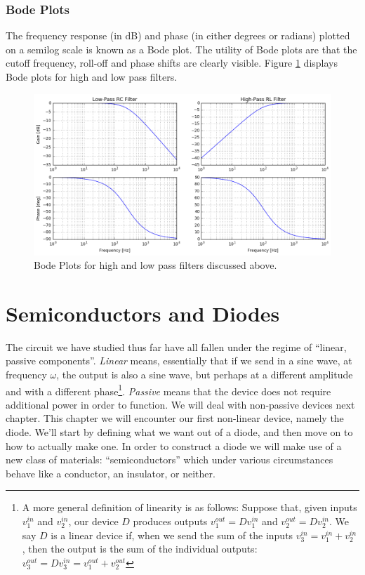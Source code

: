\documentclass{tufte-book}
\begin{document}
\subsection{Bode Plots}
The frequency response (in dB) and phase (in either degrees or radians) plotted on a semilog scale is known as a Bode plot. The utility of Bode plots are that the cutoff frequency, roll-off and phase shifts are clearly visible. Figure \ref{fig:bode_filts} displays Bode plots for high and low pass filters.


\begin{figure}[h]
\caption{Bode Plots for high and low pass filters discussed above.}
\label{fig:bode_filts}
\begin{center}
\includegraphics[width=\textwidth]{bode_filts.png}
\end{center}
\end{figure}

\chapter{Semiconductors and Diodes}
The circuit we have studied thus far have all fallen under the regime of ``linear, passive components''. \textit{Linear} means, essentially that if we send in a sine wave, at frequency $\omega$, the output is also a sine wave, but perhaps at a different amplitude and with a different phase\footnote{A more general definition of linearity is as follows: Suppose that, given inputs $v_1^{in}$ and $v_2^{in}$, our device $D$ produces outputs $v_1^{out} = Dv_1^{in}$ and $v_2^{out} = Dv_2^{in}$. We say $D$ is a linear device if, when we send the sum of the inputs $v_3^{in} = v_1^{in} + v_2^{in}$, then the output is the sum of the individual outputs: $v_3^{out} = Dv_3^{in} =  v_1^{out} + v_2^{out}$}. \textit{Passive} means that the device does not require additional power in order to function. We will deal with non-passive devices next chapter. This chapter we will encounter our first non-linear device, namely the diode. We'll start by defining what we want out of a diode, and then move on to how to actually make one. In order to construct a diode we will make use of a new class of materials: ``semiconductors'' which under various circumstances behave like a conductor, an insulator, or neither.
\end{document}
